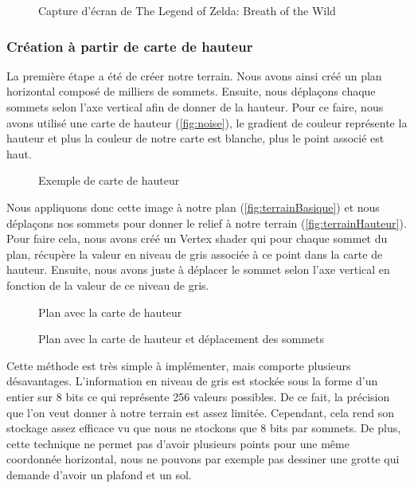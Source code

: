 \begin{figure}[!h]			
	\caption{Capture d'écran de \og The Legend of Zelda: Breath of the Wild\fg}
	 \label{fig:zeldabotw}
\end{figure}

\subsubsection{Création à partir de carte de hauteur}

La première étape a été de créer notre terrain. Nous avons ainsi créé un plan horizontal composé de milliers de sommets. Ensuite, nous déplaçons chaque sommets selon l'axe vertical afin de donner de la hauteur. Pour ce faire, nous avons utilisé une carte de hauteur (\autoref{fig:noise}), le gradient de couleur représente la hauteur et plus la couleur de notre carte est blanche, plus le point associé est haut. 

\begin{figure}[H]			
	\caption{Exemple de carte de hauteur}
	\label{fig:noise}
\end{figure}

Nous appliquons donc cette image à notre plan (\autoref{fig:terrainBasique}) et nous déplaçons nos sommets pour donner le relief à notre terrain (\autoref{fig:terrainHauteur}). Pour faire cela, nous avons créé un Vertex shader qui pour chaque sommet du plan, récupère la valeur en niveau de gris associée à ce point dans la carte de hauteur. Ensuite, nous avons juste à déplacer le sommet selon l'axe vertical en fonction de la valeur de ce niveau de gris.
\pagebreak
\begin{figure}[H]			
	
	\caption{Plan avec la carte de hauteur}
	\label{fig:terrainBasique}
\end{figure}

\begin{figure}[H]			
	
	\caption{Plan avec la carte de hauteur et déplacement des sommets}
	\label{fig:terrainHauteur}
\end{figure}
Cette méthode est très simple à implémenter, mais comporte plusieurs désavantages. L'information en niveau de gris est stockée sous la forme d'un entier sur 8 bits ce qui représente 256 valeurs possibles. De ce fait, la précision que l'on veut donner à notre terrain est assez limitée. Cependant, cela rend son stockage assez efficace vu que nous ne stockons que 8 bits par sommets. De plus, cette technique ne permet pas d'avoir plusieurs points pour une même coordonnée horizontal, nous ne pouvons par exemple pas dessiner une grotte qui demande d'avoir un plafond et un sol.

